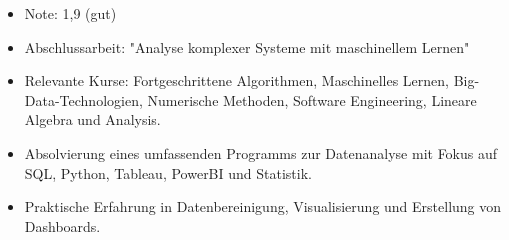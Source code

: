 \documentclass[9pt,a4paper,ragged2e,withhyper]{altacv}
\begin{document}
\begin{paracol}{2}
            \begin{itemize}
                \item Note: 1,9 (gut)
                \item Abschlussarbeit: "Analyse komplexer Systeme mit maschinellem Lernen"
                \item Relevante Kurse: Fortgeschrittene Algorithmen, Maschinelles Lernen, Big-Data-Technologien, Numerische Methoden, Software Engineering, Lineare Algebra und Analysis.
            \end{itemize}
            \vspace{0.5em}
            \begin{itemize}
                \item Absolvierung eines umfassenden Programms zur Datenanalyse mit Fokus auf SQL, Python, Tableau, PowerBI und Statistik.
                \item Praktische Erfahrung in Datenbereinigung, Visualisierung und Erstellung von Dashboards.
            \end{itemize}
            \vspace{0.5em}
        

\end{paracol}
\end{document}
